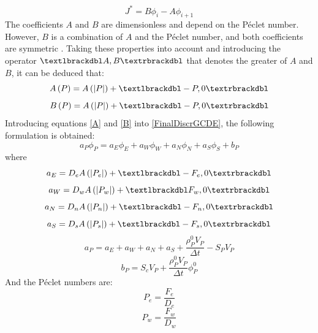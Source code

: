 \begin{equation}
J^{*}=B\phi_{i}-A\phi_{i+1}
\end{equation}
The coefficients $A$ and $B$ are dimensionless and depend on the Péclet number. However, $B$ is a combination of $A$ and the Péclet number, and both coefficients are symmetric \cite{Patankar1980}. Taking these properties into account and introducing the operator $\textlbrackdbl A,B\textrbrackdbl$ that denotes the greater of $A$ and $B$, it can be deduced that:
\begin{equation}
A\left(P\right)=A\left(|P|\right)+\textlbrackdbl-P,0\textrbrackdbl
\label{A}
\end{equation}
\begin{equation}
B\left(P\right)=A\left(|P|\right)+\textlbrackdbl-P,0\textrbrackdbl
\label{B}
\end{equation}
Introducing equations \ref{A} and \ref{B} into \ref{FinalDiscrGCDE}, the following formulation is obtained:
\begin{equation}
a_{P}\phi_{P}=a_{E}\phi_{E}+a_{W}\phi_{W}+a_{N}\phi_{N}+a_{S}\phi_{S}+b_{P}
\label{DiscretizedEquGCDE}
\end{equation}
\label{FinalDiscretizationGCDE}
where
\begin{equation}
a_{E}=D_{e}A\left(|P_{e}|\right)+\textlbrackdbl-F_{e},0\textrbrackdbl
\end{equation}
\begin{equation}
a_{W}=D_{w}A\left(|P_{w}|\right)+\textlbrackdbl F_{w},0\textrbrackdbl
\end{equation}
\begin{equation}
a_{N}=D_{n}A\left(|P_{n}|\right)+\textlbrackdbl-F_{n},0\textrbrackdbl
\end{equation}
\begin{equation}
a_{S}=D_{s}A\left(|P_{s}|\right)+\textlbrackdbl-F_{s},0\textrbrackdbl
\end{equation}
\begin{equation}
a_{P}=a_{E}+a_{W}+a_{N}+a_{S}+\frac{\rho_{P}^{0}V_{P}}{\Delta t}-S_{P}V_{P}
\end{equation}
\begin{equation}
b_{P}=S_{c}V_{P}+\frac{\rho_{P}^{0}V_{P}}{\Delta t}\phi_{P}^{0}
\end{equation}
And the Péclet numbers are:
\begin{equation}
P_{e}=\frac{F_{e}}{D_{e}}
\end{equation}
\begin{equation}
P_{w}=\frac{F_{w}}{D_{w}}
\end{equation}
